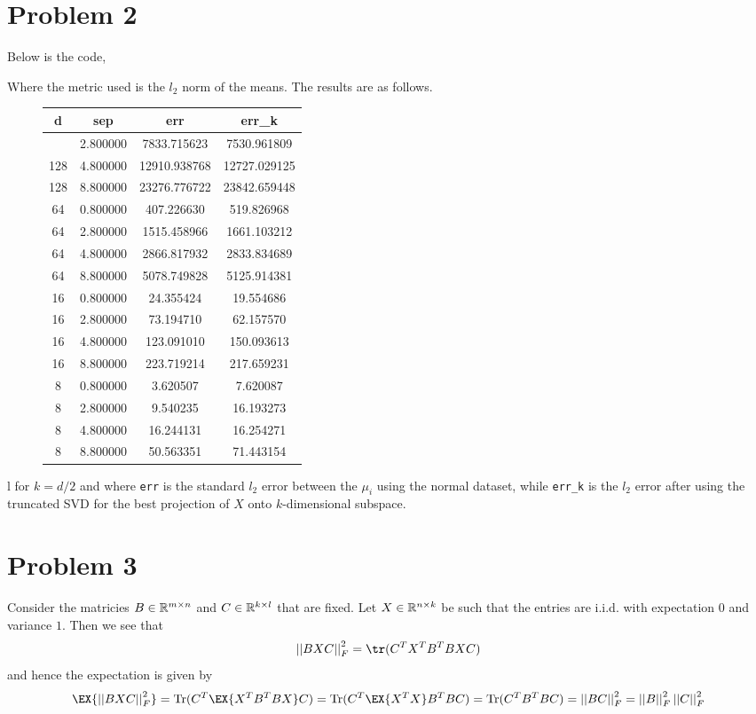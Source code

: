 \documentclass[12pt]{report}
\newcommand{\norm}[1]{\left|\left|#1\right|\right|}
\DeclareMathOperator*{\Tr}{Tr}
\begin{document}
  

\section*{Problem 2}
Below is the code,

Where the metric used is the $l_2$ norm of the means. The results are as follows.
\begin{figure}[H]
\centering
  \begin{tabular}{c|c|c|c}
    \toprule
    d & sep & err & err_k \\ \hline{}
    \midrule
    128 & 2.800000 & 7833.715623 & 7530.961809 \\
    128 & 4.800000 & 12910.938768 & 12727.029125 \\
    128 & 8.800000 & 23276.776722 & 23842.659448 \\
    64 & 0.800000 & 407.226630 & 519.826968 \\
    64 & 2.800000 & 1515.458966 & 1661.103212 \\
    64 & 4.800000 & 2866.817932 & 2833.834689 \\
    64 & 8.800000 & 5078.749828 & 5125.914381 \\
    16 & 0.800000 & 24.355424 & 19.554686 \\
    16 & 2.800000 & 73.194710 & 62.157570 \\
    16 & 4.800000 & 123.091010 & 150.093613 \\
    16 & 8.800000 & 223.719214 & 217.659231 \\
    8 & 0.800000 & 3.620507 & 7.620087 \\
    8 & 2.800000 & 9.540235 & 16.193273 \\
    8 & 4.800000 & 16.244131 & 16.254271 \\
    8 & 8.800000 & 50.563351 & 71.443154 \\
    \bottomrule
  \end{tabular}
\end{figure}
l
for $k=d/2$ and where \texttt{err} is the standard $l_2$ error between the $\mu_i$ using the normal dataset, while \texttt{err\_k} is the $l_2$ error after using the truncated SVD for the best projection of $X$ onto $k$-dimensional subspace. 

\section*{Problem 3}
Consider the matricies $B \in \mathbb{R}^{m \times n}$ and $C \in \mathbb{R}^{k \times l}$ that are fixed. Let $X \in \mathbb{R}^{n \times k}$ be such that the entries are i.i.d. with expectation $0$ and variance $1$. Then we see that
\begin{equation*}
  \norm{BXC}_F^2 = \tr(C^TX^TB^TBXC) 
\end{equation*}
and hence the expectation is given by
\begin{equation*}
  \EX{\norm{BXC}_F^2} = \Tr(C^T\EX{X^TB^TBX}C) = \Tr(C^T\EX{X^TX}B^TBC) = \Tr(C^TB^TBC) = \norm{BC}_F^2 = \norm{B}_F^2\norm{C}_F^2
\end{equation*}
\end{document}
